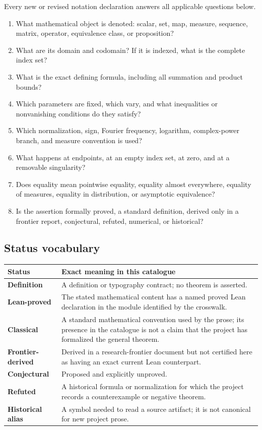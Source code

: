 \documentclass[11pt,oneside]{article}
\theoremstyle{definition}
\theoremstyle{remark}
\begin{document}
Every new or revised notation declaration answers all applicable questions below.
\begin{enumerate}
\item What mathematical object is denoted: scalar, set, map, measure, sequence, matrix,
      operator, equivalence class, or proposition?
\item What are its domain and codomain?  If it is indexed, what is the complete index set?
\item What is the exact defining formula, including all summation and product bounds?
\item Which parameters are fixed, which vary, and what inequalities or nonvanishing
      conditions do they satisfy?
\item Which normalization, sign, Fourier frequency, logarithm, complex-power branch, and
      measure convention is used?
\item What happens at endpoints, at an empty index set, at zero, and at a removable
      singularity?
\item Does equality mean pointwise equality, equality almost everywhere, equality of
      measures, equality in distribution, or asymptotic equivalence?
\item Is the assertion formally proved, a standard definition, derived only in a frontier
      report, conjectural, refuted, numerical, or historical?
\end{enumerate}

\subsection{Status vocabulary}
\label{sec:status-register}

\begin{longtable}{@{}p{}p{}@{}}
\toprule
Status & Exact meaning in this catalogue\\
\midrule
\endhead
\textbf{Definition} & A definition or typography contract; no theorem is asserted.\\
\textbf{Lean-proved} & The stated mathematical content has a named proved Lean declaration
in the module identified by the crosswalk.\\
\textbf{Classical} & A standard mathematical convention used by the prose; its presence in
the catalogue is not a claim that the project has formalized the general theorem.\\
\textbf{Frontier-derived} & Derived in a research-frontier document but not certified here as
having an exact current Lean counterpart.\\
\textbf{Conjectural} & Proposed and explicitly unproved.\\
\textbf{Refuted} & A historical formula or normalization for which the project records a
counterexample or negative theorem.\\
\textbf{Historical alias} & A symbol needed to read a source artifact; it is not canonical
for new project prose.\\
\bottomrule
\end{longtable}
\end{document}

